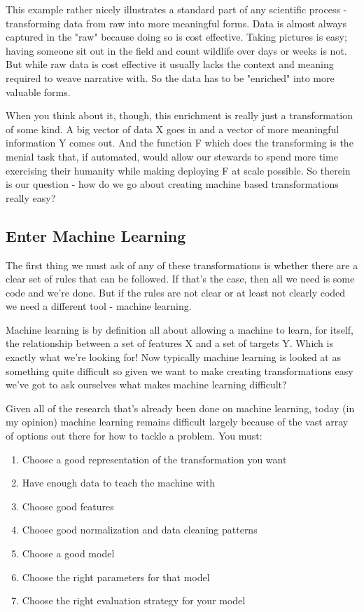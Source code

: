 \documentclass[10pt,a5paper]{book}
\begin{document}
This example rather nicely illustrates a standard part of any scientific process - transforming data from raw into more meaningful forms. Data is almost always captured in the "raw" because doing so is cost effective. Taking pictures is easy; having someone sit out in the field and count wildlife over days or weeks is not. But while raw data is cost effective it usually lacks the context and meaning required to weave narrative with. So the data has to be "enriched" into more valuable forms. 

When you think about it, though, this enrichment is really just a transformation of some kind. A big vector of data X goes in and a vector of more meaningful information Y comes out. And the function F which does the transforming is the menial task that, if automated, would allow our stewards to spend more time exercising their humanity while making deploying F at scale possible. So therein is our question - how do we go about creating machine based transformations really easy?

\subsection{Enter Machine Learning}
The first thing we must ask of any of these transformations is whether there are a clear set of rules that can be followed. If that's the case, then all we need is some code and we're done. But if the rules are not clear or at least not clearly coded we need a different tool - machine learning. 

Machine learning is by definition all about allowing a machine to learn, for itself, the relationship between a set of features X and a set of targets Y. Which is exactly what we're looking for! Now typically machine learning is looked at as something quite difficult so given  we want to make creating transformations easy we've got to ask ourselves what makes machine learning difficult? 

Given all of the research that's already been done on machine learning, today (in my opinion) machine learning remains difficult largely because of the vast array of options out there for how to tackle a problem. You must:
\begin{enumerate}
\item Choose a good representation of the transformation you want
\item Have enough data to teach the machine with
\item Choose good features
\item Choose good normalization and data cleaning patterns
\item Choose a good model
\item Choose the right parameters for that model
\item Choose the right evaluation strategy for your model
\end{enumerate}
\end{document}
